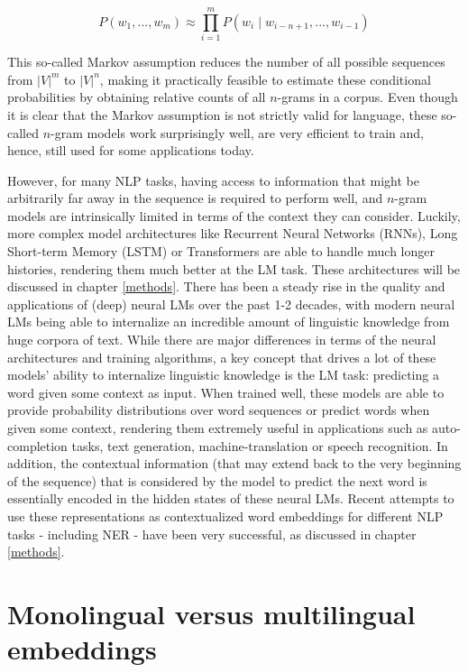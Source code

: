 \documentclass[12pt,a4paper,]{book}
\begin{document}
\begin{equation}
P\left(w_1, ..., w_m\right) \approx \prod_{i=1}^mP\left(w_i \mid w_{i - n + 1}, ..., w_{i-1}\right)
\end{equation}

This so-called Markov assumption \citep{manning2019} reduces the number of all possible sequences from \(|V|^m\) to \(|V|^n\), making it practically feasible to estimate these conditional probabilities by obtaining relative counts of all \(n\)-grams in a corpus. Even though it is clear that the Markov assumption is not strictly valid for language, these so-called \(n\)-gram models work surprisingly well, are very efficient to train and, hence, still used for some applications today.

However, for many NLP tasks, having access to information that might be arbitrarily far away in the sequence is required to perform well, and \(n\)-gram models are intrinsically limited in terms of the context they can consider. Luckily, more complex model architectures like Recurrent Neural Networks (RNNs), Long Short-term Memory (LSTM) or Transformers are able to handle much longer histories, rendering them much better at the LM task. These architectures will be discussed in chapter \ref{methods}. There has been a steady rise in the quality and applications of (deep) neural LMs over the past 1-2 decades, with modern neural LMs being able to internalize an incredible amount of linguistic knowledge from huge corpora of text. While there are major differences in terms of the neural architectures and training algorithms, a key concept that drives a lot of these models' ability to internalize linguistic knowledge is the LM task: predicting a word given some context as input. When trained well, these models are able to provide probability distributions over word sequences or predict words when given some context, rendering them extremely useful in applications such as auto-completion tasks, text generation, machine-translation or speech recognition. In addition, the contextual information (that may extend back to the very beginning of the sequence) that is considered by the model to predict the next word is essentially encoded in the hidden states of these neural LMs. Recent attempts to use these representations as contextualized word embeddings for different NLP tasks - including NER - have been very successful, as discussed in chapter \ref{methods}.

\hypertarget{monolingual-versus-multilingual-embeddings}{%
\section{Monolingual versus multilingual embeddings}\label{monolingual-versus-multilingual-embeddings}}
\end{document}
